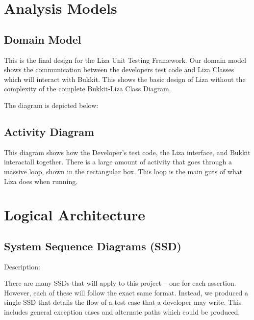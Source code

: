 \documentclass{article}
\begin{document}
\newpage

\section{Analysis Models}
\subsection{Domain Model}

This is the final design for the Liza Unit Testing Framework.  Our domain model shows the 
communication between the developers test code and Liza Classes which will interact
with Bukkit.  This shows the basic design of Liza without the complexity of the complete
Bukkit-Liza Class Diagram. \newline \newline

\noindent The diagram is depicted below:



\newpage

\subsection{Activity Diagram}

\noindent   This diagram shows how the Developer's test code, the Liza interface, and Bukkit interactall together.
There is a large amount of activity that goes through a massive loop, shown in the rectangular box.  This loop
is the main guts of what Liza does when running.



\newpage

\section{Logical Architecture}
\subsection{System Sequence Diagrams (SSD)}

Description:  \newline

There are many SSDs that will apply to this project -- one for each assertion. 
However, each of these will follow the exact same format. Instead, we
produced a single SSD that details the flow of a test case that a developer may
write.  This includes general exception cases and alternate paths which could be
produced.  \newline \newline
\end{document}
